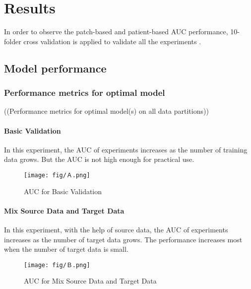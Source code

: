 \chapter{Results}
In order to observe the patch-based and patient-based AUC performance, 10-folder cross validation is applied to validate all the experiments .

\section{Model performance}
\subsection{Performance metrics for optimal model}
((Performance metrics for optimal model(s) on all data partitions)) \\

\subsubsection{Basic Validation}
In this experiment, the AUC of experiments increases as the number of training data grows. But the AUC is not high enough for practical use.
\begin{figure}[H]
    \hfil
    \begin{minipage}[t]{0.9\textwidth}
        \texttt{[image: fig/Ａ.png]}
        \caption{\label{fig:parallel1} AUC for Basic Validation}
    \end{minipage}
    \hfil
\end{figure}
\subsubsection{Mix Source Data and Target Data}
In this experiment, with the help of source data, the AUC of experiments increases as the number of target data grows. The performance increases most when the number of target data is small.
\begin{figure}[H]
    \hfil
    \begin{minipage}[t]{0.9\textwidth}
        \texttt{[image: fig/Ｂ.png]}
        \caption{\label{fig:parallel1} AUC for Mix Source Data and Target Data}
    \end{minipage}
    \hfil
\end{figure}
